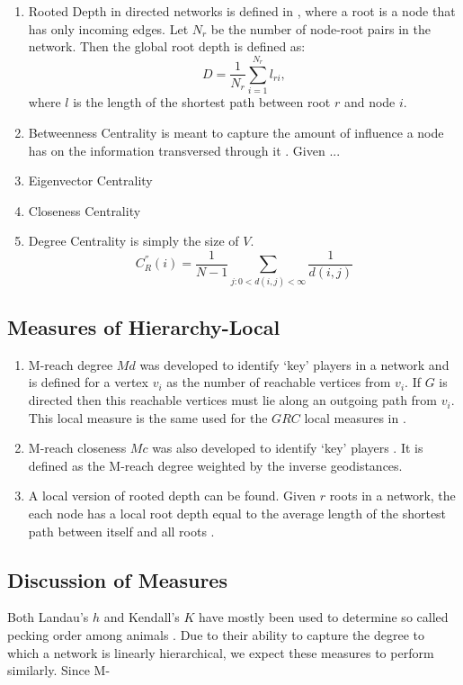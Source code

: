 \documentclass[3p,times]{elsarticle}
\begin{document}
\begin{enumerate}
	\item Rooted Depth in directed networks is defined in \cite{depth}, where a root is a node that has only incoming edges. Let $N_{r}$ be the number of node-root pairs in the network. Then the global root depth is defined as:
		$$
		D=\frac{1}{N_{r}}\sum_{i=1}^{N_r}{l_{ri}},	
		$$
		where $l$ is the length of the shortest path between root $r$ and node $i$.
	\item Betweenness Centrality is meant to capture the amount of influence a node has on the information transversed through it \cite{between}. Given ...
	\item Eigenvector Centrality 
	\item Closeness Centrality 
	\item Degree Centrality is simply the size of $V$.
		$$
		C_{R}^{''}(i)=\frac{1}{N-1}\sum_{j:0<d(i,j)<\infty}{\frac{1}{d(i,j)}}
		$$
\end{enumerate}

\subsection{Measures of Hierarchy-Local}
\begin{enumerate}
	\item M-reach degree $Md$ was developed to identify `key' players in a network \cite{key} and is defined for a vertex $v_{i}$ as the number of reachable vertices from $v_{i}.$ If 
		$G$ is directed then this reachable vertices must lie along an outgoing path from $v_{i}$. This local measure is the same used for the $GRC$ local measures in \cite{GRC}.  
	\item M-reach closeness $Mc$ was also developed to identify `key' players \cite{key}. It is defined as the M-reach degree weighted by the inverse geodistances. 
	\item A local version of rooted depth can be found. Given $r$ roots in a network, the each node has a local root depth equal to the average length of the shortest path between itself and all roots \cite{depth}.
\end{enumerate}

\subsection{Discussion of Measures}
Both Landau's $h$ and Kendall's $K$ have mostly been used to determine so called pecking order among animals \cite{animals}. Due to their ability to capture the degree to which a network is linearly hierarchical, we expect these measures to perform similarly. Since M- 
\end{document}
